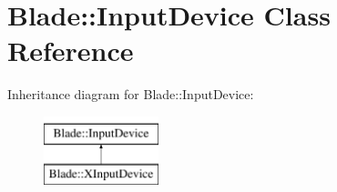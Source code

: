 \hypertarget{class_blade_1_1_input_device}{}\section{Blade\+:\+:Input\+Device Class Reference}
\label{class_blade_1_1_input_device}
Inheritance diagram for Blade\+:\+:Input\+Device\+:\begin{figure}[H]
\begin{center}
\leavevmode
\includegraphics[height=2.000000cm]{class_blade_1_1_input_device}
\end{center}
\end{figure}
